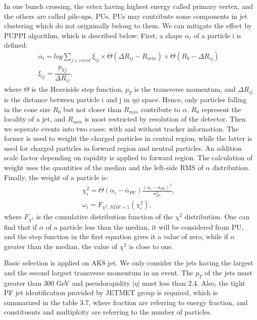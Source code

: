 In one bunch crossing, the vetex having highest energy called primary vertex, and the others are called pile-ups, PUs. PUs may contribute some components in jet clustering which do not origninally belong to them. We can mitigate the effect by PUPPI algorithm\citep{puppi}, which is described below:
First, a shape $\alpha _{i}$ of a particle i is defined: 
\begin{equation} \label{eq2}
\begin{split}
\alpha_i = log \sum\limits_{j\in event} \xi _{ij} \times \Theta(\Delta R_{ij} - R_{min}) \times \Theta(R_0 - \Delta R_{ij}) \\
\xi _{ij} = \dfrac{p_{Tj}}{\Delta R_{ij}}, 
\end{split}
\end{equation}
where $\Theta$ is the Heaviside step function, $p_{T}$ is the transverse momentum, and $\Delta R_{ij}$ is the distance between particle i and j in $\eta \phi$ space. Hence, only particles falling in the cone size $R_0$ but not closer than $R_{min}$ contribute to $\alpha $. $R_0$ represent the locality of a jet, and $R_{min}$ is most restricted by resolution of the detector. Then we seperate events into two cases: with and without tracker information. The former is used to weight the charged particles in central region, while the latter is used for charged particles in forward region and neutral particles. An addition scale factor depending on rapidity is applied to forward region. The calculation of weight uses the quantities of the median and the left-side RMS of $\alpha $ distribution. Finally, the weight of a particle is: 
\begin{equation} \label{eq3}
\begin{split}
\chi ^2_{i} = \Theta(\alpha _i - \bar{\alpha } _{PU}) \frac{ ( \alpha _i - \bar{\alpha } _{PU})^2 }{\sigma ^2 _{PU}} , \\
\omega _i = F_{\chi ^2,NDF=1}(\chi ^2_i), 
\end{split}
\end{equation}
where $F_{\chi ^2}$ is the cumulative distribution function of the $\chi ^2$ distribution. One can find that if $\alpha $ of a particle less than the median, it will be considered from PU, and the step function in the first equation gives it a value of zero, while if $\alpha $ greater than the median, the value of $\chi  ^2$ is close to one. 

Basic selection is applied on AK8 jet. We only consider the jets having the largest and the second largest transverse momentum in an event. The $p_{T}$ of the jets must greater than 300 GeV and pseudorapidity |$\eta$| must less than 2.4. Also, the tight PF jet identification provided by JETMET group is required\citep{JetID13TeVTWiki}, which is summarized in the table 3.7, where fraction are referring to energy fraction, and constituents and multiplcity are referring to the number of particles.

